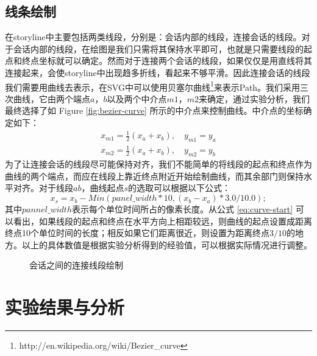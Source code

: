 \subsection{线条绘制}
在storyline中主要包括两类线段，分别是：会话内部的线段，连接会话的线段。对于会话内部的线段，在绘图是我们只需将其保持水平即可，也就是只需要线段的起点和终点坐标就可以确定。然而对于连接两个会话的线段，如果仅仅是用直线将其连接起来，会使storyline中出现趋多折线，看起来不够平滑。因此连接会话的线段我们需要用曲线去表示，在SVG中可以使用贝塞尔曲线\footnote{http://en.wikipedia.org/wiki/Bezier\_curve}来表示Path。我们采用三次曲线，它由两个端点$a$，$b$以及两个中介点$m1$，$m2$来确定，通过实验分析，我们最终选择了如 Figure \ref{fig:bezier-curve} 所示的中介点来控制曲线。中介点的坐标确定如下：
\begin{subequations}
\begin{align}
	x_{m1} = \frac{1}{2}\left ( x_a + x_b \right ), \quad y_{m1} = y_a \\
	x_{m2} = \frac{1}{2}\left ( x_a + x_b \right ), \quad y_{m2} = y_b
\end{align}
\end{subequations}
为了让连接会话的线段尽可能保持对齐，我们不能简单的将线段的起点和终点作为曲线的两个端点，而应在线段上靠近终点附近开始绘制曲线，而其余部门则保持水平对齐。对于线段$ab$，曲线起点$s$的选取可以根据以下公式：
\begin{equation}
\label{eq:curve-start}
x_s = x_b - Min(panel\_width*10, (x_b - x_a)*3.0/10.0);
\end{equation}
其中$pannel\_width$表示每个单位时间所占的像素长度。从公式 \ref{eq:curve-start} 可以看出，如果线段的起点和终点在水平方向上相距较远，则曲线的起点设置成距离终点10个单位时间的长度；相反如果它们距离很近，则设置为距离终点$3/10$的地方。以上的具体数值是根据实验分析得到的经验值，可以根据实际情况进行调整。
\begin{figure}[htb]
	\centering
	\caption{会话之间的连接线段绘制}
	\label{fig:session-space}
\end{figure}

\section{实验结果与分析}

